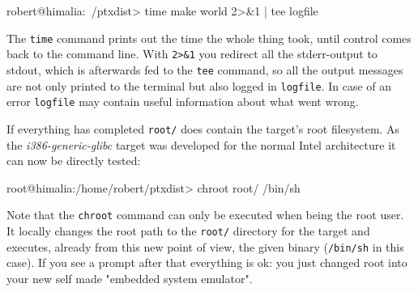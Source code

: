\begin{code}
robert@himalia:~/ptxdist> time make world 2>&1 | tee logfile
\end{code}

The \texttt{time} command prints out the time the whole thing took,
until control comes back to the command line. With \texttt{2>\&1} you
redirect all the stderr-output to stdout, which is afterwards fed to the
\texttt{tee} command, so all the output messages are not only printed to
the terminal but also logged in \texttt{logfile}. In case of an error
\texttt{logfile} may contain useful information about what went wrong. 

If everything has completed \texttt{root/} does contain the target's
root filesystem. As the \emph{i386-generic-glibc} target was developed
for the normal Intel architecture it can now be directly tested: 

\begin{code}
root@himalia:/home/robert/ptxdist> chroot root/ /bin/sh
\end{code}

Note that the \texttt{chroot} command can only be executed when being
the root user. It locally changes the root path to the \texttt{root/}
directory for the target and executes, already from this new point of
view, the given binary (\texttt{/bin/sh} in this case). If you see a
prompt after that everything is ok: you just changed root into your new
self made "embedded system emulator".   

